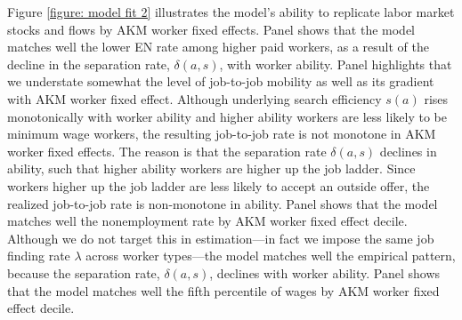 Figure \ref{figure: model fit 2} illustrates the model's ability to replicate labor market stocks and flows by AKM worker fixed effects. Panel  shows that the model matches well the lower EN rate among higher paid workers, as a result of the decline in the separation rate, $\delta(a,s)$, with worker ability. Panel  highlights that we understate somewhat the level of job-to-job mobility as well as its gradient with AKM worker fixed effect. Although underlying search efficiency $s(a)$ rises monotonically with worker ability and higher ability workers are less likely to be minimum wage workers, the resulting job-to-job rate is not monotone in AKM worker fixed effects. The reason is that the separation rate $\delta(a,s)$ declines in ability, such that higher ability workers are higher up the job ladder. Since workers higher up the job ladder are less likely to accept an outside offer, the realized job-to-job rate is non-monotone in ability. Panel  shows that the model matches well the nonemployment rate by AKM worker fixed effect decile. Although we do not target this in estimation---in fact we impose the same job finding rate $\lambda$ across worker types---the model matches well the empirical pattern, because the separation rate, $\delta(a,s)$, declines with worker ability. Panel  shows that the model matches well the fifth percentile of wages by AKM worker fixed effect decile.

